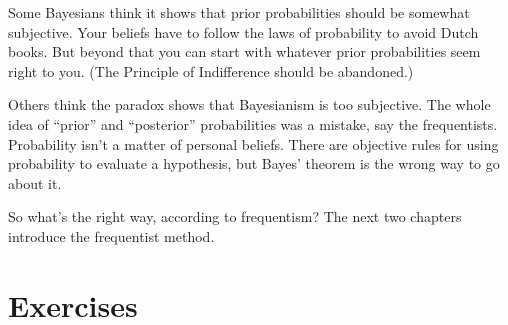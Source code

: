 \documentclass[justified]{tufte-book}
\theoremstyle{definition}
\theoremstyle{definition}
\theoremstyle{definition}
\theoremstyle{remark}
\begin{document}
Some Bayesians think it shows that prior probabilities should be
somewhat subjective. Your beliefs have to follow the laws of probability
to avoid Dutch books. But beyond that you can start with whatever prior
probabilities seem right to you. (The Principle of Indifference should
be abandoned.)

Others think the paradox shows that Bayesianism is too subjective. The
whole idea of ``prior'' and ``posterior'' probabilities was a mistake,
say the frequentists. Probability isn't a matter of personal beliefs.
There are objective rules for using probability to evaluate a
hypothesis, but Bayes' theorem is the wrong way to go about it.

So what's the right way, according to frequentism? The next two chapters
introduce the frequentist method.

\hypertarget{exercises-14}{%
\section*{Exercises}\label{exercises-14}}
\end{document}
